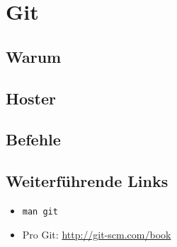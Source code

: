 \chapter{Git}
\section{Warum}
\section{Hoster}
\section{Befehle}
\section{Weiterführende Links}
\begin{itemize}
  \item \texttt{man git}
  \item Pro Git: \url{http://git-scm.com/book}
\end{itemize}
